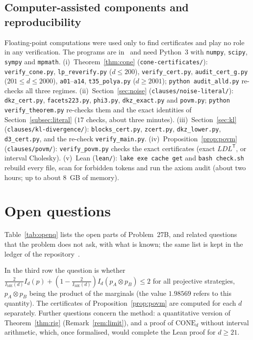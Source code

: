 \documentclass[11pt]{article}
\theoremstyle{remark}
\numberwithin{equation}{section}
\newcommand{\IME}{I_{\mathrm{ME}}}
\newcommand{\CONE}{\mathrm{CONE}}
\begin{document}
\subsection{Computer-assisted components and reproducibility}\label{subsec:computer}
\begin{sloppypar}
Floating-point computations were used only to find certificates and play no role in any verification. The programs are
in~\cite{repo} and need Python~3 with \texttt{numpy}, \texttt{scipy}, \texttt{sympy} and \texttt{mpmath}.
(i)~Theorem~\ref{thm:cone} (\texttt{cone-certificates/}): \texttt{verify\_cone.py}, \texttt{lp\_reverify.py}
($d\le200$), \texttt{verify\_cert.py}, \texttt{audit\_cert\_g.py} ($201\le d\le2000$), \texttt{a01}--\texttt{a14},
\texttt{t35\_polya.py} ($d\ge2001$); \texttt{python audit\_alld.py} re-checks all three regimes.
(ii)~Section~\ref{sec:noise} (\texttt{clauses/noise-literal/}): \texttt{dkz\_cert.py}, \texttt{facets223.py},
\texttt{phi3.py}, \texttt{dkz\_exact.py} and \texttt{povm.py}; \texttt{python verify\_theorem.py} re-checks them and the
exact identities of Section~\ref{subsec:literal} ($17$ checks, about three minutes).
(iii)~Section~\ref{sec:kl} (\texttt{clauses/kl-divergence/}): \texttt{blocks\_cert.py}, \texttt{zcert.py},
\texttt{dkz\_lower.py}, \texttt{d3\_cert.py}, and the re-check \texttt{verify\_main.py}.
(iv)~Proposition~\ref{prop:povm} (\texttt{clauses/povm/}): \texttt{verify\_povm.py} checks the exact
certificates (exact $LDL^{\mathsf T}$, or interval Cholesky).
(v)~Lean (\texttt{lean/}): \texttt{lake exe cache get} and \texttt{bash check.sh} rebuild every file, scan for
forbidden tokens and run the axiom audit (about two hours; up to about 8~GB of memory).
\end{sloppypar}

\section{Open questions}\label{sec:open}

Table~\ref{tab:openq} lists the open parts of Problem~27B, and related questions that the problem does not ask, with
what is known; the same list is kept in the ledger of the repository~\cite{repo}.

In the third row the question is whether $\frac2{\IME(d)}I_d(p)+(1-\frac2{\IME(d)})I_d(p_A\otimes p_B)\le2$ for all
projective strategies, $p_A\otimes p_B$ being the product of the marginals (the value $1.98569$ refers to this quantity).
The certificates of Proposition~\ref{prop:povm} are computed for each $d$ separately. Further questions concern the
method: a quantitative version of Theorem~\ref{thm:rig} (Remark~\ref{rem:limit}), and a proof of $\CONE_d$ without
interval arithmetic, which, once formalised, would complete the Lean proof for $d\ge21$.
\end{document}
